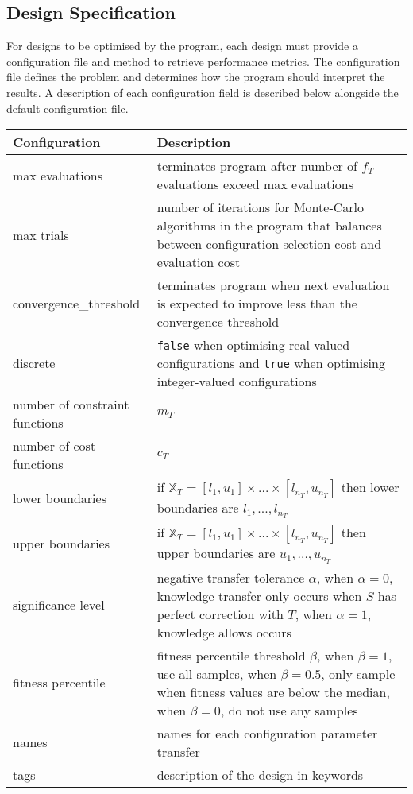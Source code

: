 \documentclass[10pt,a4paper]{article}
\begin{document}
\subsection{Design Specification}
For designs to be optimised by the program, each design must provide a configuration file and method to retrieve performance metrics. The configuration file defines the problem and determines how the program should interpret the results. A description of each configuration field is described below alongside the default configuration file.

\noindent
\begin{tabularx}{\linewidth}{|l|X|}
	\hline
	Configuration & Description\\\hline
	max evaluations & terminates program after number of $f_T$ evaluations exceed max evaluations\\\hline
	max trials & number of iterations for Monte-Carlo algorithms in the program that balances between configuration selection cost and evaluation cost\\\hline
	convergence\_threshold & terminates program when next evaluation is expected to improve less than the convergence threshold\\\hline
	discrete & \verb|false| when optimising real-valued configurations and \verb|true| when optimising integer-valued configurations\\\hline
	number of constraint functions & $m_T$\\\hline
	number of cost functions & $c_T$\\\hline
	lower boundaries & if $\mathbb{X}_T=[l_1,u_1]\times...\times[l_{n_T},u_{n_T}]$ then lower boundaries are $l_1,...,l_{n_T}$\\\hline
	upper boundaries & if $\mathbb{X}_T=[l_1,u_1]\times...\times[l_{n_T},u_{n_T}]$ then upper boundaries are $u_1,...,u_{n_T}$\\\hline
	significance level & negative transfer tolerance $\alpha$, when $\alpha=0$, knowledge transfer only occurs when $S$ has perfect correction with $T$, when $\alpha=1$, knowledge allows occurs\\\hline
	fitness percentile & fitness percentile threshold $\beta$, when $\beta=1$, use all samples, when $\beta=0.5$, only sample when fitness values are below the median, when $\beta=0$, do not use any samples\\\hline
	names & names for each configuration parameter transfer\\\hline
	tags & description of the design in keywords\\\hline
\end{tabularx}
\end{document}
